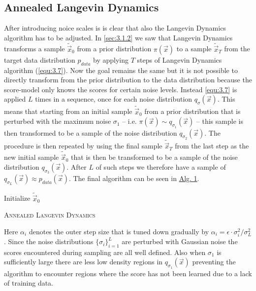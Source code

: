 \subsection{Annealed Langevin Dynamics} \label{3.3.2}
After introducing noice scales is is clear that also the Langevin Dynamics algorithm has to be adjusted. In \cref{sec:3.1.2} we saw that Langevin Dynamics transforms a sample $\tilde{\vec{x}}_0$ from a prior distribution $\pi(\vec{x})$ to a sample $\tilde{\vec{x}}_T$ from the target data distribution $p_{data}$ by applying $T$ steps of Langevin Dynamics algorithm (\cref{equ:3.7}). Now the goal remains the same but it is not possible to directly transform from the prior distribution to the data distribution because the score-model only knows the scores for certain noise levels. Instead \cref{equ:3.7} is applied $L$ times in a sequence, once for each noise distribution $q_\sigma(\vec{x})$. This means that starting from an initial sample $\tilde{\vec{x}}_0$ from a prior distribution that is perturbed with the maximum noise $\sigma_1$ – i.e. $\pi(\vec{x})\sim q_{\sigma_1}(\vec{x})$ – this sample is then transformed to be a sample of the noise distribution $q_{\sigma_{2}}(\vec{x})$. The procedure is then repeated by using the final sample $\tilde{\vec{x}}_T$ from the last step as the new initial sample $\tilde{\vec{x}}_0$ that is then be transformed to be a sample of the noise distribution $q_{\sigma_{3}}(\vec{x})$. After $L$ of such steps we therefore have a sample of $q_{\sigma_L}(\vec{x})\approx p_{data}(\vec{x})$. The final algorithm can be seen in \hyperref[alg:1]{Alg. 1}.
%
\begin{algorithm} \label{alg:1}
    \DontPrintSemicolon
    Initialize $\tilde{\vec{x}}_0$\;
    \caption{\textsc{Annealed Langevin Dynamics}}
\end{algorithm}
%
Here $\alpha_i$ denotes the outer step size that is tuned down gradually by $\alpha_i=\epsilon\cdot\sigma_i^2/\sigma_L^2$. Since the noise distributions $\{\sigma_i\}_{i=1}^L$ are perturbed with Gaussian noise the scores encountered during sampling are all well defined. Also when $\sigma_1$ is sufficiently large there are less low density regions in $q_{\sigma_1}(\vec{x})$ preventing the algorithm to encounter regions where the score has not been learned due to a lack of training data.

